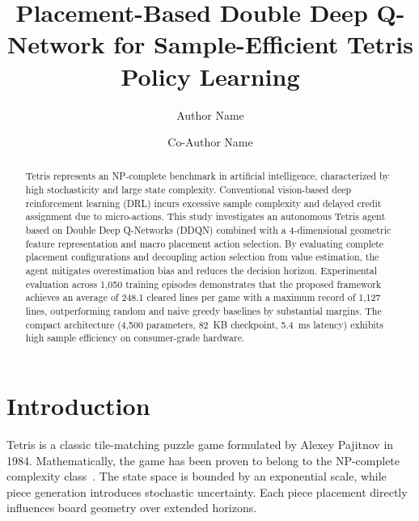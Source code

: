 \documentclass[runningheads]{llncs}
\begin{document}
\title{Placement-Based Double Deep Q-Network for Sample-Efficient Tetris Policy Learning}


\author{Author Name \and
Co-Author Name}



\maketitle

\begin{abstract}
Tetris represents an NP-complete benchmark in artificial intelligence, characterized by high stochasticity and large state complexity. Conventional vision-based deep reinforcement learning (DRL) incurs excessive sample complexity and delayed credit assignment due to micro-actions. This study investigates an autonomous Tetris agent based on Double Deep Q-Networks (DDQN) combined with a 4-dimensional geometric feature representation and macro placement action selection. By evaluating complete placement configurations and decoupling action selection from value estimation, the agent mitigates overestimation bias and reduces the decision horizon. Experimental evaluation across 1,050 training episodes demonstrates that the proposed framework achieves an average of 248.1 cleared lines per game with a maximum record of 1,127 lines, outperforming random and naive greedy baselines by substantial margins. The compact architecture (4,500 parameters, 82~KB checkpoint, 5.4~ms latency) exhibits high sample efficiency on consumer-grade hardware.

\end{abstract}

\section{Introduction}
Tetris is a classic tile-matching puzzle game formulated by Alexey Pajitnov in 1984. Mathematically, the game has been proven to belong to the NP-complete complexity class~\cite{demaine2002tetris}. The state space is bounded by an exponential scale, while piece generation introduces stochastic uncertainty. Each piece placement directly influences board geometry over extended horizons.
\end{document}
